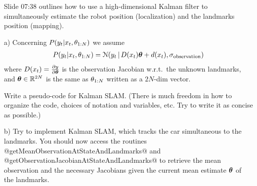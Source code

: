 

\renewcommand{\course}{Robotics}
\renewcommand{\coursepicture}{roboticsLecture}
\renewcommand{\coursedate}{Winter 2014}
\renewcommand{\exnum}{extra}

\exercises


Slide 07:38 outlines how to use a high-dimensional Kalman
filter to simultaneously estimate the robot position (localization)
and the landmarks position (mapping).

a) Concerning $P(y_t | x_t, \theta_{1:N})$ we assume
\begin{align*}
P(y_t | x_t, \theta_{1:N}) = {\cal N}(y_t \,|\, D(x_t) \boldsymbol{\theta} + d(x_t), \sigma_\text{observation})
\end{align*}
where $D(x_t)=\frac{\partial y}{\partial \boldsymbol{\theta}}$ is the observation Jacobian
w.r.t.\ the unknown landmarks, and $\boldsymbol{\theta}\in{\mathbb{R}}^{2N}$ is the same as
$\theta_{1:N}$ written as a $2N$-dim vector.

Write a pseudo-code for Kalman SLAM. (There is much freedom in
how to organize the code, choices of notation and variables, etc. Try to
write it as concise as possible.)


b) Try to implement Kalman SLAM, which tracks the car simultaneous to the
landmarks. You should now access the
routines @getMeanObservationAtStateAndLandmarks@ and
@getObservationJacobianAtStateAndLandmarks@ to retrieve the
mean observation and the necessary Jacobians given the current
mean estimate $\boldsymbol{\theta}$ of the landmarks.

\exerfoot



